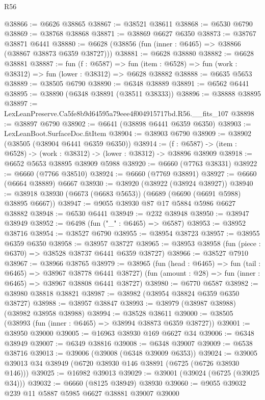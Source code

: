 \begin{lexlean}{R56}
\begin{coremodule}
@38866 := @6626 @38865
@38867 := @38521 @38611
@38868 := @6530 @6790
@38869 := @38768 @38868
@38871 := @38869 @6627 @6350
@38873 := @38767 @38871 @6441
@38880 := @6628 (@38856 (fun (inner : @6465) => @38866 (@38867 @38873 @6359 @38727)))
@38881 := @6628 @38880
@38882 := @6628 @38881
@38887 := fun (f : @6587) =>
  fun (item : @6528) => fun (work : @38312) => fun (lower : @38312) => @6628 @38882
@38888 := @6635 @5653
@38889 := @38505 @6790
@38890 := @6348 @38889
@38891 := @6562 @6441
@38895 := @38890 (@6348 @38891 (@38511 @38333))
@38896 := @38888 @38895
@38897 := LexLeanPreserve.Ca5fe8b9d64595a79eee4f004915717bd.R56.__fits_107
@38898 := @38897 @6790
@38902 := @6641 (@38898 @6441 @6359 @6350)
@38903 := LexLeanBoot.SurfaceDoc.fitItem
@38904 := @38903 @6790
@38909 := @38902 (@38505 (@38904 @6441 @6359 @6350))
@38914 := (f : @6587) -> (item : @6528) -> (work : @38312) -> (lower : @38312) -> @38896 @38909
@38918 := @6652 @5653 @38895 @38909 @5988
@38920 := @6660 (@7763 @38331)
@38922 := @6660 (@7766 @38510)
@38924 := @6660 (@7769 @38891)
@38927 := @6660 (@6664 @38889) @6667
@38930 := @38920 (@38922 (@38924 @38927))
@38940 := @38918 @38930 (@6673 (@6683 @5653)) (@6689 (@6690 (@6691 @5988) @38895 @6667))
@38947 := @9055 @38930 @87 @17 @5884 @5986 @6627 @38882
@38948 := @6530 @6441
@38949 := @232 @38948
@38950 := @38947 @38949
@38952 := @6498 (fun ("_" : @6465) => @6587)
@38953 := @38952 @38716
@38954 := @38527 @6790
@38955 := @38954 @38723
@38957 := @38955 @6359 @6350
@38958 := @38957 @38727
@38965 := @38953 @38958 (fun (piece : @6370) => @38528 @38737 @6441 @6359 @38727)
@38966 := @38527 @7910
@38967 := @38966 @38765
@38979 := @38965
    (fun (head : @6465) => fun (tail : @6465) => @38967 @38778 @6441 @38727)
    (fun (amount : @28) => fun (inner : @6465) => @38967 @38808 @6441 @38727)
@38980 := @6770 @6587
@38982 := @38980 @38818 @38821
@38987 := @38982 (@38954 @38824 @6359 @6350 @38727)
@38988 := @38957 @38847
@38993 := @38979 (@38987 @38988) (@38982 @38958 @38988)
@38994 := @38528 @38611
@39000 := @38505 (@38993 (fun (inner : @6465) => @38994 @38873 @6359 @38727))
@39001 := @38950 @39000
@39005 := @16963 @38930 @169 @6627 @34
@39006 := @6348 @38949
@39007 := @6349 @38816
@39008 := @6348 @39007
@39009 := @6538 @38716
@39013 := @39006 (@39008 (@6348 @39009 @6353))
@39024 := @39005 @39013 @34 @38949 (@6720 @38930 @146 @38891 (@6725 (@6726 @38930 @146)))
@39025 := @16982 @39013
@39029 := @39001 (@39024 (@6725 (@39025 @34)))
@39032 := @6660 (@8125 @38949) @38930
@39060 := @9055
    @39032
    @239
    @11
    @5887
    @5985
    @6627
    @38881
    @39007
    @39000

\end{coremodule}
\end{lexlean}
